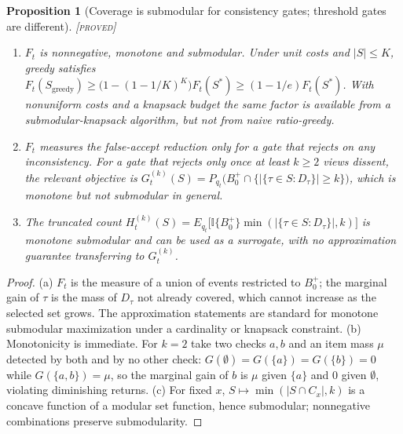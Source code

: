 \documentclass[11pt]{article}
\newtheorem{proposition}{Proposition}
\theoremstyle{remark}
\newcommand{\status}[1]{\hfill{\normalfont\small\textsc{[#1]}}}
\begin{document}
\begin{proposition}[Coverage is submodular for consistency gates; threshold gates are different]\status{proved}
\begin{enumerate}
\item[(a)] $F_t$ is nonnegative, monotone and submodular. Under unit costs and $|S|\le K$, greedy satisfies $F_t(S_{\mathrm{greedy}})\ge\bigl(1-(1-1/K)^K\bigr)F_t(S^\ast)\ge(1-1/e)F_t(S^\ast)$. With nonuniform costs and a knapsack budget the same factor is available from a submodular-knapsack algorithm, but not from naive ratio-greedy.
\item[(b)] $F_t$ measures the false-accept reduction only for a gate that rejects on \emph{any} inconsistency. For a gate that rejects only once at least $k\ge2$ views dissent, the relevant objective is
$G_t^{(k)}(S)=P_{q_t}\bigl(B_0^+\cap\{|\{\tau\in S:D_\tau\}|\ge k\}\bigr)$, which is monotone but not submodular in general.
\item[(c)] The truncated count $H_t^{(k)}(S)=E_{q_t}\bigl[\mathbb{I}\{B_0^+\}\min(|\{\tau\in S:D_\tau\}|,k)\bigr]$ is monotone submodular and can be used as a surrogate, with no approximation guarantee transferring to $G^{(k)}_t$.
\end{enumerate}
\end{proposition}
\begin{proof}
(a) $F_t$ is the measure of a union of events restricted to $B_0^+$; the marginal gain of $\tau$ is the mass of $D_\tau$ not already covered, which cannot increase as the selected set grows. The approximation statements are standard for monotone submodular maximization under a cardinality or knapsack constraint.
(b) Monotonicity is immediate. For $k=2$ take two checks $a,b$ and an item mass $\mu$ detected by both and by no other check: $G(\emptyset)=G(\{a\})=G(\{b\})=0$ while $G(\{a,b\})=\mu$, so the marginal gain of $b$ is $\mu$ given $\{a\}$ and $0$ given $\emptyset$, violating diminishing returns.
(c) For fixed $x$, $S\mapsto\min(|S\cap C_x|,k)$ is a concave function of a modular set function, hence submodular; nonnegative combinations preserve submodularity.
\end{proof}
\end{document}
